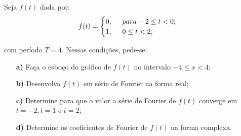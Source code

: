 \linespread{1.5}
Seja $f(t)$ dada por:
\begin{equation*}
    f(t) = \begin{cases}
        0, \hspace{0.5cm} para -2 \leq t < 0;\\
        1, \hspace{0.5cm} 0 \leq t < 2;
    \end{cases}\,
\end{equation*}

com período $T = 4$. Nessas condições, pede-se:

\begin{itemize}
    \item[\textbf{a)}] Faça o esboço do gráfico de $f(t)$ no intervalo $-4 \leq x < 4$;
    \item[\textbf{b)}] Desenvolva $f(t)$ em série de Fourier na forma real;
    \item[\textbf{c)}] Determine para que o valor a série de Fourier de $f(t)$ converge em $t = -2, t = 1$ e $t = 2$;
    \item[\textbf{d)}] Determine os coeficientes de Fourier de $f(t)$ na forma complexa.
\end{itemize}